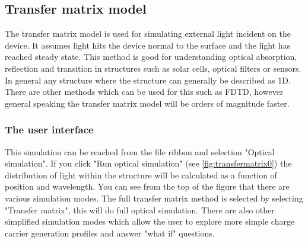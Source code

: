 \subsection{Transfer matrix model}
The transfer matrix model is used for simulating external light incident on the device. It assumes light hits the device normal to the surface and the light has reached steady state. This method is good for understanding optical absorption, reflection and transition in structures such as solar cells, optical filters or sensors.  In general any structure where the structure can generally be described as 1D. There are other methods which can be used for this such as FDTD, however general speaking the transfer matrix model will be orders of magnitude faster.

\subsubsection{The user interface}
This simulation can be reached from the file ribbon and selection "Optical simulation".  If you click "Run optical simulation" (see \ref{fig:transfermatrix0}) the distribution of light within the structure will be calculated as a function of position and wavelength. You can see from the top of the figure that there are various simulation modes. The full transfer matrix method is selected by selecting "Transfer matrix", this will do full optical simulation.  There are also other simplified simulation modes which allow the user to explore more simple charge carrier generation profiles and answer "what if" questions.

